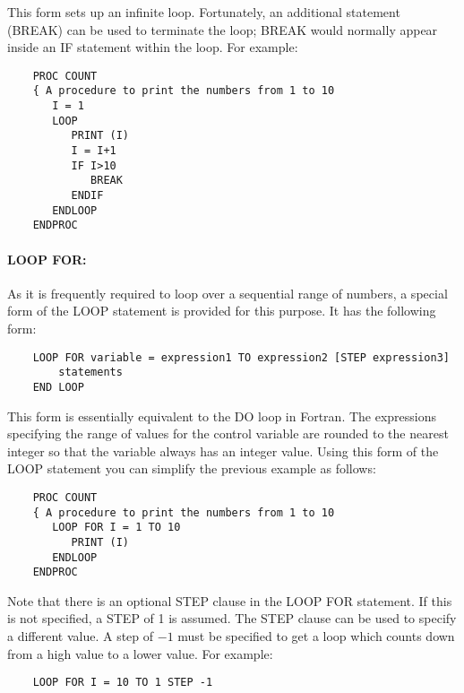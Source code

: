 This form sets up an infinite loop.
Fortunately, an additional statement (BREAK) can be used to terminate the loop;
BREAK would normally appear inside an IF statement within the loop.
For example:

\begin{small}
\begin{verbatim}
    PROC COUNT
    { A procedure to print the numbers from 1 to 10
       I = 1
       LOOP
          PRINT (I)
          I = I+1
          IF I>10
             BREAK
          ENDIF
       ENDLOOP
    ENDPROC
\end{verbatim}
\end{small}

\paragraph{LOOP FOR:}\hfill

As it is frequently required to loop over a sequential range of numbers, a
special form of the LOOP statement is provided for this purpose.
It has the following form:

\begin{small}
\begin{verbatim}
    LOOP FOR variable = expression1 TO expression2 [STEP expression3]
        statements
    END LOOP
\end{verbatim}
\end{small}

This form is essentially equivalent to the DO loop in Fortran.
The expressions specifying the range of values for the control variable are
rounded to the nearest integer so that the variable always has an integer value.
Using this form of the LOOP statement you can simplify the previous example as
follows:

\begin{small}
\begin{verbatim}
    PROC COUNT
    { A procedure to print the numbers from 1 to 10
       LOOP FOR I = 1 TO 10
          PRINT (I)
       ENDLOOP
    ENDPROC
\end{verbatim}
\end{small}

Note that there is an optional STEP clause in the LOOP FOR statement.
If this is not specified, a STEP of 1 is assumed.
The STEP clause can be used to specify a different value.
A step of $-1$ must be specified to get a loop which counts down from a high
value to a lower value.
For example:

\begin{small}
\begin{verbatim}
    LOOP FOR I = 10 TO 1 STEP -1
\end{verbatim}
\end{small}

